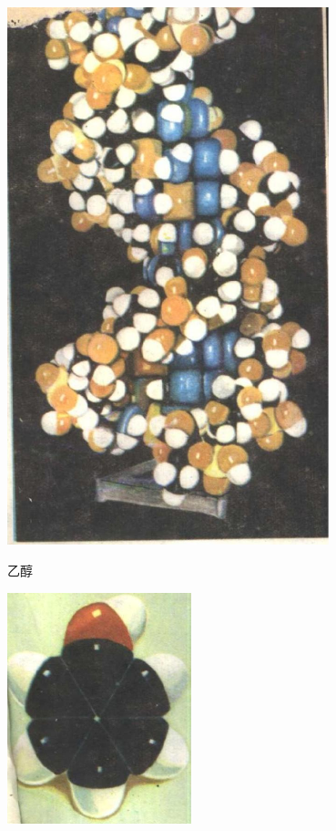 \documentclass[10pt]{article}
\begin{document}
\begin{center}
\includegraphics[max width=0.7\textwidth]{images/01912d16-be99-77bb-9535-4f3ed8d9946f_4_858542.jpg}
\end{center}

乙醇

\begin{center}
\includegraphics[max width=0.4\textwidth]{images/01912d16-be99-77bb-9535-4f3ed8d9946f_4_545979.jpg}
\end{center}
\end{document}
